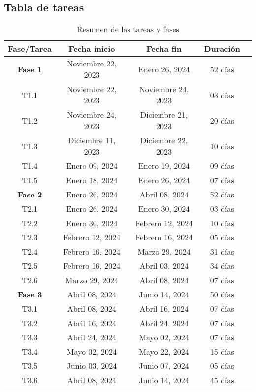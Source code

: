 \subsection{Tabla de tareas}
\begin{table}[ht]
    \centering
    \begin{tabular}{|c|c|c|c|c|}
    \hline
    \textbf{Fase/Tarea} & \textbf{Fecha inicio} & \textbf{Fecha fin} & \textbf{Duración} \\
    \hline
    \textbf{Fase 1} & Noviembre 22, 2023 & Enero 26, 2024 & 52 días \\
    \hline
    T1.1 & Noviembre 22, 2023 & Noviembre 24, 2023 & 03 días \\
    T1.2 & Noviembre 24, 2023 & Diciembre 21, 2023 & 20 días \\
    T1.3 & Diciembre 11, 2023 & Diciembre 22, 2023 & 10 días \\
    T1.4 & Enero 09, 2024 & Enero 19, 2024 & 09 días \\
    T1.5 & Enero 18, 2024 & Enero 26, 2024 & 07 días \\
    \hline
    \textbf{Fase 2} & Enero 26, 2024 & Abril 08, 2024 & 52 días \\
    \hline
    T2.1 & Enero 26, 2024 & Enero 30, 2024 & 03 días \\
    T2.2 & Enero 30, 2024 & Febrero 12, 2024 & 10 días \\
    T2.3 & Febrero 12, 2024 & Febrero 16, 2024 & 05 días \\
    T2.4 & Febrero 16, 2024 & Marzo 29, 2024 & 31 días \\
    T2.5 & Febrero 16, 2024 & Abril 03, 2024 & 34 días \\
    T2.6 & Marzo 29, 2024 & Abril 08, 2024 & 07 días \\
    \hline
    \textbf{Fase 3} & Abril 08, 2024 & Junio 14, 2024 & 50 días \\
    \hline
    T3.1 & Abril 08, 2024 & Abril 16, 2024 & 07 días \\
    T3.2 & Abril 16, 2024 & Abril 24, 2024 & 07 días \\
    T3.3 & Abril 24, 2024 & Mayo 02, 2024 & 07 días \\
    T3.4 & Mayo 02, 2024 & Mayo 22, 2024 & 15 días \\
    T3.5 & Junio 03, 2024 & Junio 07, 2024 & 05 días \\
    T3.6 & Abril 08, 2024 & Junio 14, 2024 & 45 días \\
    \hline
    \end{tabular}
    \caption{Resumen de las tareas y fases}
    \label{tab:my_label}
    \end{table}

